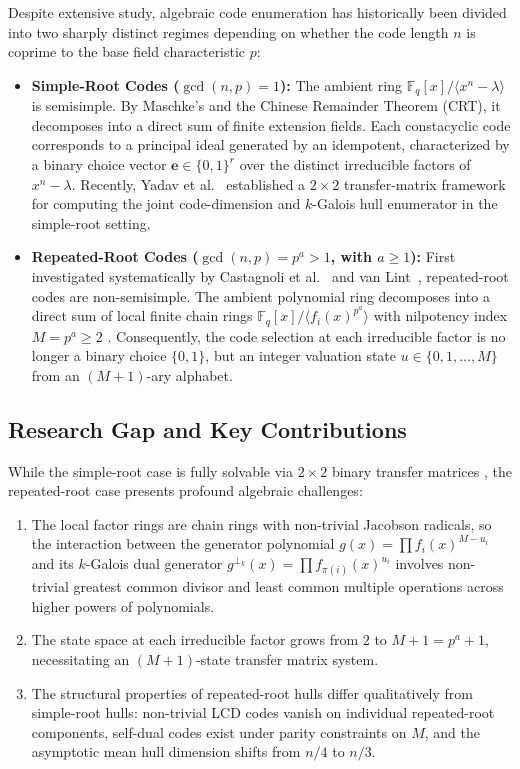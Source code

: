 \documentclass[preprint,12pt]{elsarticle}
\numberwithin{equation}{section}
\theoremstyle{plain}
\theoremstyle{definition}
\theoremstyle{remark}
\begin{document}
Despite extensive study, algebraic code enumeration has historically been divided into two sharply distinct regimes depending on whether the code length $n$ is coprime to the base field characteristic $p$:
\begin{itemize}
    \item \textbf{Simple-Root Codes ($\gcd(n, p) = 1$):} The ambient ring $\mathbb{F}_q[x]/\langle x^n - \lambda\rangle$ is semisimple. By Maschke's and the Chinese Remainder Theorem (CRT), it decomposes into a direct sum of finite extension fields. Each constacyclic code corresponds to a principal ideal generated by an idempotent, characterized by a binary choice vector $\mathbf{e} \in \{0, 1\}^r$ over the distinct irreducible factors of $x^n - \lambda$. Recently, Yadav et al.~\cite{Yadav2026} established a $2 \times 2$ transfer-matrix framework for computing the joint code-dimension and $k$-Galois hull enumerator in the simple-root setting.
    \item \textbf{Repeated-Root Codes ($\gcd(n, p) = p^a > 1$, with $a \ge 1$):} First investigated systematically by Castagnoli et al.~\cite{Castagnoli1991} and van Lint~\cite{vanLint1991}, repeated-root codes are non-semisimple. The ambient polynomial ring decomposes into a direct sum of local finite chain rings $\mathbb{F}_q[x]/\langle f_i(x)^{p^a}\rangle$ with nilpotency index $M = p^a \ge 2$ \cite{Dinh2004,Dinh2010,Dinh2012,Sharma2016}. Consequently, the code selection at each irreducible factor is no longer a binary choice $\{0, 1\}$, but an integer valuation state $u \in \{0, 1, \dots, M\}$ from an $(M+1)$-ary alphabet.
\end{itemize}

\subsection{Research Gap and Key Contributions}
While the simple-root case is fully solvable via $2 \times 2$ binary transfer matrices \cite{Yadav2026}, the repeated-root case presents profound algebraic challenges:
\begin{enumerate}
    \item The local factor rings are chain rings with non-trivial Jacobson radicals, so the interaction between the generator polynomial $g(x) = \prod f_i(x)^{M - u_i}$ and its $k$-Galois dual generator $g^{\perp_k}(x) = \prod f_{\pi(i)}(x)^{u_i}$ involves non-trivial greatest common divisor and least common multiple operations across higher powers of polynomials.
    \item The state space at each irreducible factor grows from $2$ to $M+1 = p^a + 1$, necessitating an $(M+1)$-state transfer matrix system.
    \item The structural properties of repeated-root hulls differ qualitatively from simple-root hulls: non-trivial LCD codes vanish on individual repeated-root components, self-dual codes exist under parity constraints on $M$, and the asymptotic mean hull dimension shifts from $n/4$ to $n/3$.
\end{enumerate}
\end{document}
